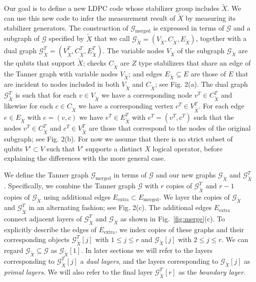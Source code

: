 \documentclass[reprint,
superscriptaddress,
 amsmath,amssymb,
 aps, longbibliography
]{revtex4-1}
\newcommand{\rev}[1]{{#1}}
\begin{document}
Our goal is to define a new LDPC code whose stabilizer group includes $\tilde{X}$. We can use this new code to infer the measurement result of $\tilde{X}$ by measuring its stabilizer generators. 
The construction of $\mathcal{G}_{\textrm{merged}}$ is expressed in terms of $\mathcal{G}$ and a subgraph of $\mathcal{G}$ specified by $\tilde{X}$ that we call $\mathcal{G}_{\tilde{X}} = \left(V_{\tilde{X}}, C_{\tilde{X}}, E_{\tilde{X}}\right)$, together with a dual graph $\mathcal{G}_{\tilde{X}}^{T} = (V_{\tilde{X}}^{T}, C_{\tilde{X}}^{T},E_{\tilde{X}}^{T})$. The variable nodes $V_{\tilde{X}}$ of the subgraph $\mathcal{G}_{\tilde{X}}$ are the qubits that support $\tilde{X}$; checks $C_{\tilde{X}}$ are $Z$ type stabilizers \rev{that share an edge of the Tanner graph with} variable nodes $V_{\tilde{X}}$; and edges $E_{\tilde{X}} \subseteq E$ are those of $E$ that are incident to nodes included in both $V_{\tilde{X}}$ and $C_{\tilde{X}}$; see Fig. 2(a).  The dual graph $\mathcal{G}_{\tilde{X}}^T$ is such that for each $v \in V_{\tilde{X}}$ we have a corresponding node $v^{T} \in C^{T}_{\tilde{X}}$ and likewise for each $c \in C_{\tilde{X}}$ we have a corresponding vertex $c^{T} \in V^{T}_{\tilde{X}}$. For each edge $e \in E_{\tilde{X}} $ with $e = (v,c)$ we have $e^{T} \in E^{T}_{\tilde{X}}$ with $e^{T} = (v^{T},c^{T})$ such that the nodes $v^{T} \in C^T_{\tilde{X}}$ and $c^{T} \in V^T_{\tilde{X}}$ are those that correspond to the nodes of the original subgraph; see Fig. 2(b).
For now we assume that there is no strict subset of qubits $V' \subset V$ such that $V'$ supports a distinct $X$ logical operator, before explaining the differences with the more general case.

We define the Tanner graph $\mathcal{G}_{\textrm{merged}}$ in terms of $\mathcal{G}$ and our new graphs $\mathcal{G}_{\tilde{X}}$ and  $\mathcal{G}_{\tilde{X}}^T$.  Specifically, we combine the Tanner graph $\mathcal{G}$ with $r$ copies of $\mathcal{G}^{T}_{\tilde{X}}$ and $r-1$ copies of $\mathcal{G}_{\tilde{X}}$ using additional edges $E_\textrm{extra} \subset E_\textrm{merged}$. We layer the copies of $\mathcal{G}_{\tilde{X}}$ and  $\mathcal{G}_{\tilde{X}}^T$ in an alternating fashion; see Fig. 2(c). The additional edges $E_{\textrm{extra}}$ connect adjacent layers of $\mathcal{G}^{T}_{\tilde{X}}$ and $\mathcal{G}_{\tilde{X}}$ as shown in Fig.~\ref{fig:merge}(c). To explicitly describe the edges of $E_\textrm{extra}$, we index copies of these graphs and their corresponding objects $\mathcal{G}^{T}_{\tilde{X}}[j]$ with $1 \le j \le r$ and $\mathcal{G}_{\tilde{X}}[j]$ with $2 \le j \le r$. We can regard $\mathcal{G}_{\tilde{X}} \subseteq \mathcal{G}$ as $\mathcal{G}_{\tilde{X}}[1]$. In later sections we will refer to the layers corresponding to $\mathcal{G}^T_{\tilde{X}}[j]$ a \emph{dual layers}, and the layers corresponding to $\mathcal{G}_{\tilde{X}}[j]$ as \emph{primal layers}. We will also refer to the final layer $\mathcal{G}^T_{\tilde{X}}[r]$ as the \emph{boundary layer}.
\end{document}
